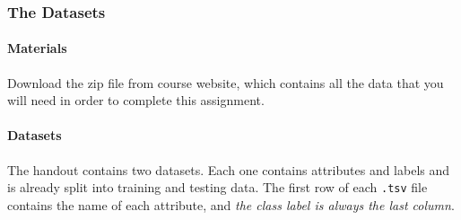 \documentclass[11pt,addpoints,answers]{exam}
\begin{document}
\subsubsection{The Datasets}
\label{sec:data}

\paragraph{Materials} Download the zip file from course website, which contains all the data that you will need in order to complete this assignment.

\paragraph{Datasets}

The handout contains two datasets. Each one contains attributes and labels and is already split into training and testing data. The first row of each \lstinline{.tsv} file contains the name of each attribute, and \emph{the class label is always the last column}.
\end{document}
